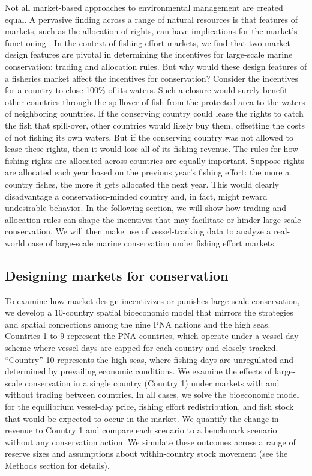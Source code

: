 \documentclass[12pt]{article}
\begin{document}
Not all market-based approaches to environmental management are created equal. A pervasive finding across a range of natural resources is that features of markets, such as the allocation of rights, can have implications for the market's functioning \cite{libecap_1989}. In the context of fishing effort markets, we find that two market design features are pivotal in determining the incentives for large-scale marine conservation: trading and allocation rules. But why would these design features of a fisheries market affect the incentives for conservation? Consider the incentives for a country to close 100\% of its waters. Such a closure would surely benefit other countries through the spillover of fish from the protected area to the waters of neighboring countries. If the conserving country could lease the rights to catch the fish that spill-over, other countries would likely buy them, offsetting the costs of not fishing its own waters. But if the conserving country was not allowed to lease these rights, then it would lose all of its fishing revenue. The rules for how fishing rights are allocated across countries are equally important. Suppose rights are allocated each year based on the previous year's fishing effort: the more a country fishes, the more it gets allocated the next year. This would clearly disadvantage a conservation-minded country and, in fact, might reward undesirable behavior. In the following section, we will show how trading and allocation rules can shape the incentives that may facilitate or hinder large-scale conservation. We will then make use of vessel-tracking data to analyze a real-world case of large-scale marine conservation under fishing effort markets.

\subsection{Designing markets for conservation}

To examine how market design incentivizes or punishes large scale conservation, we develop a 10-country spatial bioeconomic model that mirrors the strategies and spatial connections among the nine PNA nations and the high seas. Countries 1 to 9 represent the PNA countries, which operate under a vessel-day scheme where vessel-days are capped for each country and closely tracked. ``Country'' 10 represents the high seas, where fishing days are unregulated and determined by prevailing economic conditions. We examine the effects of large-scale conservation in a single country (Country 1) under markets with and without trading between countries. In all cases, we solve the bioeconomic model for the equilibrium vessel-day price, fishing effort redistribution, and fish stock that would be expected to occur in the market. We quantify the change in revenue to Country 1 and compare each scenario to a benchmark scenario without any conservation action. We simulate these outcomes across a range of reserve sizes and assumptions about within-country stock movement (see the Methods section for details).
\end{document}
